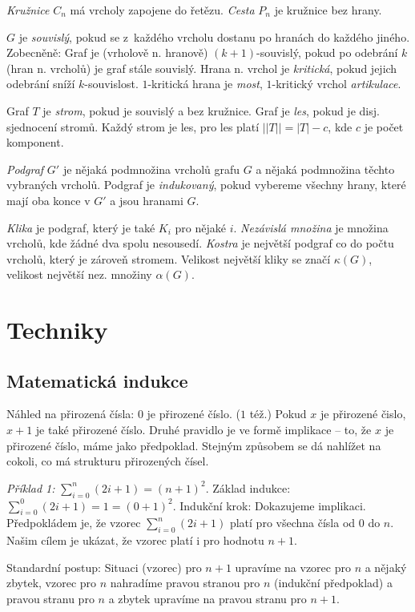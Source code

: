 {\it Kružnice} $C_n$ má vrcholy zapojene do řetězu. {\it Cesta} $P_n$
je kružnice bez hrany.

$G$ je {\it souvislý}, pokud se z~každého vrcholu dostanu po hranách do každého
jiného. Zobecněně: Graf je (vrholově n. hranově) $(k+1)$-souvislý, pokud po odebrání
$k$ (hran n. vrcholů) je graf stále souvislý. Hrana n. vrchol je {\it kritická}, pokud jejich
odebrání sníží $k$-souvislost. $1$-kritická hrana je {\it most}, $1$-kritický vrchol
{\it artikulace}.

Graf $T$ je {\it strom}, pokud je souvislý a bez kružnice. Graf je {\it les}, pokud je
disj. sjednocení stromů. Každý strom je les, pro les platí $||T|| = |T| -c$, kde $c$
je počet komponent.

{\it Podgraf} $G'$ je nějaká podmnožina vrcholů grafu $G$ a nějaká podmnožina
těchto vybraných vrcholů. Podgraf je {\it indukovaný}, pokud vybereme všechny hrany,
které mají oba konce v $G'$ a jsou hranami $G$.

{\it Klika} je podgraf, který je také $K_i$ pro nějaké $i$. {\it Nezávislá množina}
je množina vrcholů, kde žádné dva spolu nesousedí. {\it Kostra} je největší podgraf co
do počtu vrcholů, který je zároveň stromem. Velikost největší kliky se značí
$\kappa(G)$, velikost největší nez. množiny $\alpha(G)$.


\section{Techniky}

\subsection{Matematická indukce}

Náhled na přirozená čísla:
\itemize\ibull
\: $0$ je přirozené číslo. ($1$ též.)
\: Pokud $x$ je přirozené čislo, $x+1$ je také přirozené číslo.
\endlist
Druhé pravidlo je ve formě implikace -- to, že $x$ je přirozené číslo,
máme  jako předpoklad. Stejným způsobem se dá nahlížet na
cokoli, co má  strukturu přirozených čísel.

{\it Příklad 1:} $\sum_{i=0}^n (2i+1) = (n+1)^2$.
\itemize\ibull
\: Základ indukce: $\sum_{i=0}^0 (2i+1) = 1 = (0+1)^2$.
\: Indukční krok: Dokazujeme implikaci. Předpokládem je, že vzorec $\sum_{i=0}^n (2i+1)$ platí pro všechna čísla od $0$ do $n$. Našim cílem je ukázat, že vzorec platí i pro hodnotu $n+1$.

Standardní postup: Situaci (vzorec) pro $n+1$ upravíme na vzorec pro $n$ a nějaký zbytek,
vzorec pro $n$ nahradíme pravou stranou pro $n$ (indukční předpoklad) a pravou stranu pro $n$
a zbytek upravíme na pravou stranu pro $n+1$. 
\endlist

